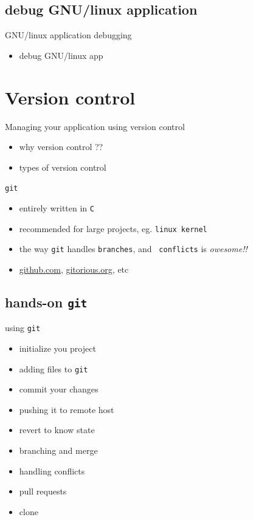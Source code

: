 \documentclass{beamer}
\begin{document}
 \subsection{debug GNU/linux application}
 \begin{frame}{GNU/linux application debugging}
   \begin{block}{}
     \begin{itemize}
     \item debug GNU/linux app
     \end{itemize}
   \end{block}
 \end{frame}

 \section{Version control}
 \begin{frame}{Managing your application using version control}
   \begin{itemize}
   \item why version control ??
   \item types of version control 
   \end{itemize}

   \begin{block}{{\tt git}}
     \begin{itemize}
     \item entirely written in {\tt C}
     \item recommended for large projects, eg. {\tt linux kernel}
     \item the way {\tt git} handles {\tt branches}, and {\tt
       conflicts} is {\em owesome!!}
     \item {\url{github.com}}, {\url{gitorious.org}}, etc
     \end{itemize}
   \end{block}
 \end{frame}

 \subsection{hands-on {\tt git}}
 \begin{frame}{using {\tt git}}
     \begin{itemize} \pause
     \item initialize you project \pause
     \item adding files to {\tt git} \pause
     \item commit your changes \pause
     \item pushing it to remote host \pause
     \item revert to know state \pause
     \item branching and merge \pause
     \item handling conflicts \pause
     \item pull requests \pause
     \item clone 
     \end{itemize}
 \end{frame}
\end{document}
